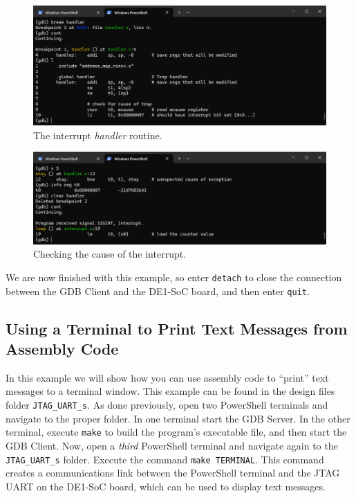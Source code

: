 \documentclass[11pt, twoside, pdftex]{article}
\begin{document}
\begin{figure}[h]
    \begin{center}
        \includegraphics[scale=.6]{figures/interrupt_s4.png}
        \caption{The interrupt {\it handler} routine.}
        \label{fig:interrupt_s4}
    \end{center}
\end{figure}

\begin{figure}[h]
    \begin{center}
        \includegraphics[scale=.6]{figures/interrupt_s5.png}
        \caption{Checking the cause of the interrupt.}
        \label{fig:interrupt_s5}
    \end{center}
\end{figure}

We are now finished with this example, so enter \texttt{detach} to close the connection between 
the GDB Client and the DE1-SoC board, and then enter \texttt{quit}.

\subsection{Using a Terminal to Print Text Messages from Assembly Code}

In this example we will show how you can use assembly code to ``print'' text messages 
to a terminal window.  This example can be found in the design files folder 
\texttt{JTAG\_UART\_s}. As done previously, open two PowerShell terminals and navigate to
the proper folder. In one terminal
start the GDB Server. In the other terminal, execute \texttt{make} to build the program's
executable file, and then start the GDB Client. Now, open a {\it third} PowerShell
terminal and navigate again to the \texttt{JTAG\_UART\_s} folder. Execute the command 
\texttt{make TERMINAL}. This command creates a communications link between the PowerShell
terminal and the JTAG UART on the DE1-SoC board, which can be used to display text
messages. 
\end{document}
